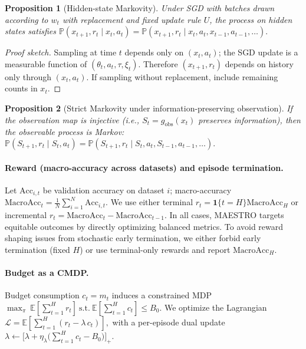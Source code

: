 \documentclass[11pt]{article}
\newtheorem{proposition}{Proposition}
\newcommand{\MacroAcc}{\mathrm{MacroAcc}}
\newcommand{\E}{\mathbb{E}}
\newcommand{\1}{\mathbf{1}}
\newcommand{\Prb}{\mathbb{P}}
\newcommand{\MAESTRO}{\textsc{MAESTRO}\xspace}
\begin{document}
\begin{proposition}[Hidden-state Markovity]
Under SGD with batches drawn according to $w_t$ \emph{with replacement} and fixed update rule $U$, the process on hidden states satisfies
\(
\Prb(x_{t+1},r_t \mid x_t,a_t)=\Prb(x_{t+1},r_t \mid x_t,a_t,x_{t-1},a_{t-1},\dots).
\)
\end{proposition}
\begin{proof}[Proof sketch]
Sampling at time $t$ depends only on $(x_t,a_t)$; the SGD update is a measurable function of $(\theta_t,a_t,\tau,\xi_t)$.
Therefore $(x_{t+1},r_t)$ depends on history only through $(x_t,a_t)$.
If sampling without replacement, include remaining counts in $x_t$.
\end{proof}

\begin{proposition}[Strict Markovity under information-preserving observation]\label{prop:inject}
If the observation map is injective (i.e., $S_t=g_{\mathrm{obs}}(x_t)$ preserves information), then the observable process is Markov:
\(
\Prb(S_{t+1},r_t \mid S_t,a_t)=\Prb(S_{t+1},r_t \mid S_t,a_t,S_{t-1},a_{t-1},\dots).
\)
\end{proposition}

\paragraph{Reward (macro-accuracy across datasets) and episode termination.}
Let $\mathrm{Acc}_{i,t}$ be validation accuracy on dataset $i$; macro-accuracy $\MacroAcc_t=\frac{1}{N}\sum_{i=1}^N \mathrm{Acc}_{i,t}$.
We use either terminal $r_t=\1\{t=H\}\MacroAcc_H$ or incremental $r_t=\MacroAcc_t-\MacroAcc_{t-1}$. In all cases, \MAESTRO{} targets equitable outcomes by directly optimizing balanced metrics.
To avoid reward shaping issues from stochastic early termination, we either forbid early termination (fixed $H$) or use terminal-only rewards and report $\MacroAcc_H$.

\paragraph{Budget as a CMDP.}
Budget consumption $c_t=m_t$ induces a constrained MDP
\(
\max_\pi \ \E[\sum_{t=1}^H r_t]\ \text{s.t.}\ \E[\sum_{t=1}^H c_t]\le B_0.
\)
We optimize the Lagrangian
\(
\mathcal{L}=\E\!\left[\sum_{t=1}^H (r_t-\lambda\,c_t)\right],
\)
with a per-episode dual update
\(
\lambda \leftarrow \big[\lambda + \eta_\lambda\big(\sum_{t=1}^H c_t - B_0\big)\big]_+.
\)
\end{document}

